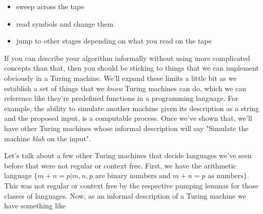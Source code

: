 \documentclass[11pt]{article}
\begin{document}
\begin{itemize}
\item sweep across the tape
\item read symbols and change them
\item jump to other stages depending on what you read on the tape
\end{itemize}

If you can describe your algorithm informally without using more complicated concepts than that, then you should be sticking to things that we can implement obviously in a Turing machine. We'll expand these limits a little bit as we establish a set of things that we \emph{know} Turing machines can do, which we can reference like they're predefined functions in a programming language. For example, the ability to simulate another machine given its description as a string and the proposed input, is a computable process. Once we've shown that, we'll have other Turing machines whose informal description will say "Simulate the machine \emph{blah} on the input". 

Let's talk about a few other Turing machines that decide languages we've seen before that were not regular or context free. First, we have the arithmetic language $\{m+n=p | m,n,p \text{ are binary numbers and } m+n=p \text{ as numbers}\}$. This was not regular or context free by the respective pumping lemmas for those classes of languages. Now, as an informal description of a Turing machine we have something like
\end{document}
